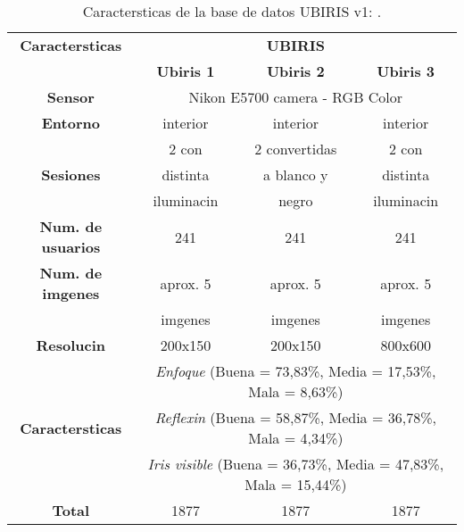 \begin{table}[h]
    \centering
    \scriptsize
    \begin{tabular}{|c|c|c|c|}
        \hline
        \textbf{Caractersticas}   & \multicolumn{3}{|c|}{\textbf{UBIRIS}}            \\
        \cline{2-4}
                                   & \textbf{Ubiris 1}      & \textbf{Ubiris 2}  & \textbf{Ubiris 3}         \\
        \hline
        \textbf{Sensor}            & \multicolumn{3}{|c|}{Nikon E5700 camera - RGB Color}            \\
        \hline
        \textbf{Entorno}           & interior               & interior          & interior         \\
        \hline
                                   & 2 con                  & 2 convertidas     & 2 con          \\
        \textbf{Sesiones}          & distinta               & a blanco y        & distinta         \\
                                   & iluminacin            & negro             & iluminacin          \\
        \hline
        \textbf{Num. de usuarios}  & 241                    & 241               & 241       \\
        \hline
        \textbf{Num. de imgenes}  & aprox. 5               & aprox. 5          & aprox. 5  \\
                                   & imgenes               & imgenes          & imgenes  \\
        \hline
        \textbf{Resolucin}        & 200x150                & 200x150           & 800x600    \\
        \hline
                            & \multicolumn{3}{|c|}{\emph{Enfoque} (Buena = 73,83\%, Media = 17,53\%, Mala = 8,63\%)}\\
        \textbf{Caractersticas}   & \multicolumn{3}{|c|}{\emph{Reflexin} (Buena = 58,87\%, Media = 36,78\%, Mala = 4,34\%) } \\
                        & \multicolumn{3}{|c|}{\emph{Iris visible} (Buena = 36,73\%, Media = 47,83\%, Mala = 15,44\%)}\\
        \hline
        \textbf{Total}             & 1877                   & 1877              & 1877      \\
        \hline
    \end{tabular}
    \caption{Caractersticas de la base de datos UBIRIS v1: \citet{database:UBIRISv1_ProencaAlexandre2005,database:UBIRISv1_web}.}
    \label{table:info_UBIRIS}
\end{table}


